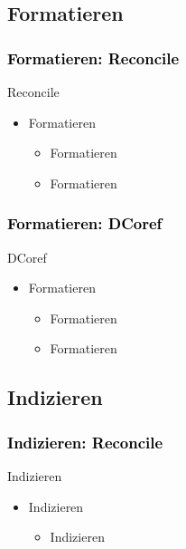 \documentclass[xcolor=dvipsnames]{beamer}
\begin{document}


\subsection{Formatieren}


\begin{frame}\frametitle{\textcolor{black}{Formatieren: Reconcile}}

\begin{block}{Reconcile}
\begin{itemize}
\item Formatieren
\begin{itemize}
\item Formatieren
\item Formatieren
\end{itemize}
\end{itemize}
\end{block}

\end{frame}


\begin{frame}\frametitle{\textcolor{black}{Formatieren: DCoref}}

\begin{block}{DCoref}
\begin{itemize}
\item Formatieren
\begin{itemize}
\item Formatieren
\item Formatieren
\end{itemize}
\end{itemize}
\end{block}

\end{frame}



\subsection{Indizieren}


\begin{frame}\frametitle{\textcolor{black}{Indizieren: Reconcile}}

\begin{block}{Indizieren}
\begin{itemize}
\item Indizieren
\begin{itemize}
\item Indizieren
\end{itemize}
\end{itemize}
\end{block}

\end{frame}
\end{document}
